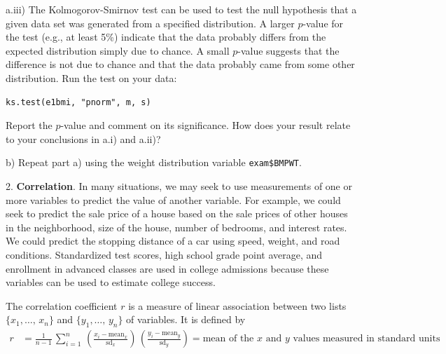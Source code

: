 \documentclass[10pt]{article}
\begin{document}
\hspace{20pt} a.iii) The Kolmogorov-Smirnov test can be used to test the null hypothesis that
a given data set was generated from a specified distribution.  A larger $p$-value for the test
(e.g., at least 5\%) indicate that the data probably differs from the expected distribution
simply due to chance.  A small $p$-value suggests that the difference is not due to chance
and that the data probably came from some other distribution.
Run the test on your data:\vspace{-6pt}
\begin{verbatim}
ks.test(e1bmi, "pnorm", m, s)
\end{verbatim}
Report the $p$-value and comment on its significance.  How does your result relate to your
conclusions in a.i) and a.ii)?
\medskip

\hspace{10pt} b) Repeat part a) using the weight distribution variable
\texttt{exam\$BMPWT}.
\medskip
\bigskip

2. \textbf{Correlation}. 
In many situations, we may seek to use measurements of one or more variables to predict
the value of another variable.  For example, we could seek to predict the sale price of a 
house based on the sale prices of other houses in the neighborhood, size of the house, 
number of bedrooms, and interest rates.  We could predict the stopping distance of a car
using speed, weight, and road conditions.  Standardized test scores, high school grade point
average, and enrollment in advanced classes are used in college admissions because these
variables can be used to estimate college success.

The correlation coefficient $r$ is a measure of linear association between two lists
$\{x_1, \dots, \,x_n\}$ and $\{y_1, \dots,\,y_n\}$ of variables. It is defined by 
\begin{align*}
r &=\frac{1}{n-1}\,\sum_{i=1}^n\,\left(\frac{x_i - \mbox{mean}_x}{\mbox{sd}_x}\right)\,
  \left(\frac{y_i - \mbox{mean}_y}{\mbox{sd}_y}\right) =
\mbox{mean of the $x$ and $y$ values measured in standard units}%
\end{align*}\vspace{-15pt}
\end{document}
